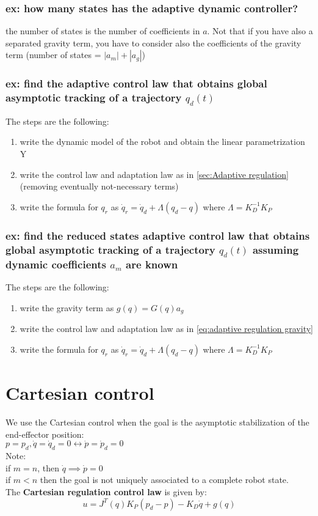 \documentclass[a4paper,12pt]{article}
\begin{document}
\subsubsection{ex: how many states has the adaptive dynamic controller?}
the number of states is the number of coefficients 
in $a$. Not that if you have also a separated 
gravity term, you have to consider also the
coefficients of the gravity term (number of states = $ |a_m| + |a_g|$)
\subsubsection{ex: find the adaptive control law that obtains global 
asymptotic tracking of a trajectory $q_d(t)$}
The steps are the following:
\begin{enumerate}
    \item write the dynamic model of the robot and 
    obtain the linear parametrization Y
    \item write the control law and adaptation law as in \ref{sec:Adaptive regulation}
    (removing eventually not-necessary terms)
    \item write the formula for $q_r$ as $\dot{q}_r = \dot{q}_d + \Lambda(q_d - q)$
    where $\Lambda=K_D^{-1}K_P$
\end{enumerate}
\subsubsection{ex: find the reduced states adaptive control law that 
obtains global 
asymptotic tracking of a trajectory $q_d(t)$ assuming 
dynamic coefficients $a_m$ are known}
The steps are the following:
\begin{enumerate}
    \item write the gravity term as $g(q) = G(q)a_g$
    \item write the control law and adaptation law as in \ref{eq:adaptive regulation gravity}
    \item write the formula for $q_r$ as $\dot{q}_r = \dot{q}_d + \Lambda(q_d - q)$
    where $\Lambda=K_D^{-1}K_P$
\end{enumerate}





\section{Cartesian control}
We use the Cartesian control when the goal is the 
asymptotic stabilization of the end-effector position:\\
$p=p_d, \dot{q}=\dot{q}_d=0 \leftrightarrow \dot{p}=\dot{p}_d=0$\\
Note:\\
if $m= n$, then $\dot{q} \implies \dot{p} = 0$\\
if $m<n$ then the goal is not uniquely associated
to a complete robot state.\\
The \textbf{Cartesian regulation control law} is given by:
\begin{equation}\label{eq:Cartesian regulation control law}
    u = J^T(q)K_P(p_d-p) - K_D\dot{q}+g(q)
\end{equation}
\end{document}
